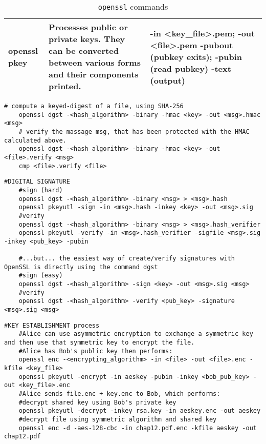 \begin{table}[H]
\begin{tabular}{|p{5cm}|p{4cm}|p{7cm}|}
        openssl pkey 
            & Processes public or private keys. They can be converted between various forms and their components printed.
            & -in <key\_file>.pem; -out <file>.pem
                \newline -pubout (pubkey exits); 
                    \newline -pubin (read pubkey)
                \newline -text (output)
        \\ \hline 


    \end{tabular}

    \caption{\texttt{openssl} commands}

\end{table}

\begin{lstlisting}[style=bashStyle]
    # compute a keyed-digest of a file, using SHA-256
    openssl dgst -<hash_algorithm> -binary -hmac <key> -out <msg>.hmac <msg>
    # verify the massage msg, that has been protected with the HMAC calculated above.
    openssl dgst -<hash_algorithm> -binary -hmac <key> -out <file>.verify <msg>
    cmp <file>.verify <file>
\end{lstlisting}


\begin{lstlisting}[style=bashStyle]
    #DIGITAL SIGNATURE
    #sign (hard)
    openssl dgst -<hash_algorithm> -binary <msg> > <msg>.hash
    openssl pkeyutl -sign -in <msg>.hash -inkey <key> -out <msg>.sig
    #verify
    openssl dgst -<hash_algorithm> -binary <msg> > <msg>.hash_verifier
    openssl pkeyutl -verify -in <msg>.hash_verifier -sigfile <msg>.sig -inkey <pub_key> -pubin

    #...but... the easiest way of create/verify signatures with OpenSSL is directly using the command dgst
    #sign (easy)
    openssl dgst -<hash_algorithm> -sign <key> -out <msg>.sig <msg>
    #verify
    openssl dgst -<hash_algorithm> -verify <pub_key> -signature <msg>.sig <msg>

\end{lstlisting}

\begin{lstlisting}[style=bashStyle]
    #KEY ESTABLISHMENT process
    #Alice can use asymmetric encryption to exchange a symmetric key and then use that symmetric key to encrypt the file.
    #Alice has Bob's public key then performs:
    openssl enc -<encrypting_algorithm> -in <file> -out <file>.enc -kfile <key_file>
    openssl pkeyutl -encrypt -in aeskey -pubin -inkey <bob_pub_key> -out <key_file>.enc
    #Alice sends file.enc + key.enc to Bob, which performs:
    #decrypt shared key using Bob's private key
    openssl pkeyutl -decrypt -inkey rsa.key -in aeskey.enc -out aeskey
    #decrypt file using symmetric algorithm and shared key
    openssl enc -d -aes-128-cbc -in chap12.pdf.enc -kfile aeskey -out chap12.pdf
    
\end{lstlisting}

